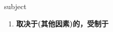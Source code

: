 
\begin{frame}
{\huge subject}
\begin{center}
\begin{enumerate}\Large
  \item \textbf{取决于(其他因素)的，受制于}
\end{enumerate}
\end{center}
\end{frame}
